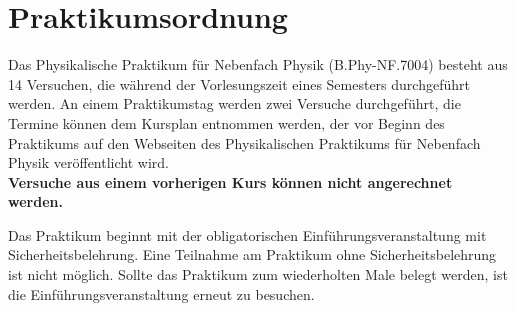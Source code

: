 
\chapter{Praktikumsordnung} \label{v:ordnung}

Das Physikalische Praktikum für Nebenfach Physik (B.Phy-NF.7004) besteht aus 14 Versuchen, die während der Vorlesungszeit eines Semesters durchgeführt werden. An einem Praktikumstag werden zwei Versuche durchgeführt, die Termine können dem Kursplan entnommen werden, der vor Beginn des Praktikums auf den Webseiten des Physikalischen Praktikums für Nebenfach Physik veröffentlicht wird. \\
\textbf{Versuche aus einem vorherigen Kurs können nicht angerechnet werden.}

Das Praktikum beginnt mit der obligatorischen Einführungsveranstaltung mit Sicherheitsbelehrung. Eine Teilnahme am Praktikum ohne Sicherheitsbelehrung ist nicht möglich. Sollte das Praktikum zum wiederholten Male belegt werden, ist die Einführungsveranstaltung erneut zu besuchen.


%

